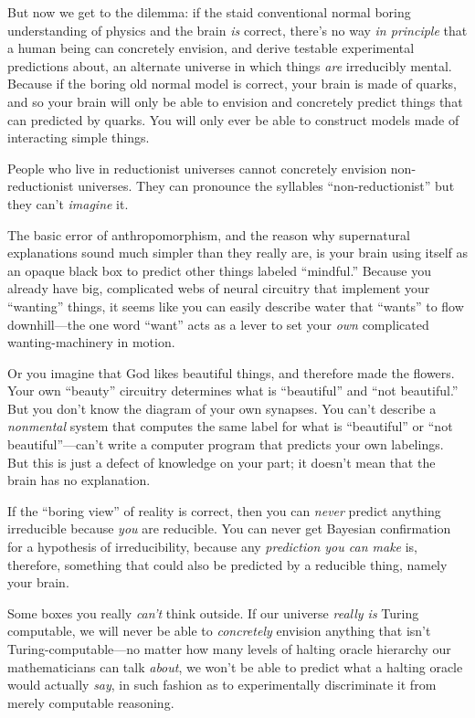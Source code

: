 {
 But now we get to the dilemma: if the staid conventional normal
boring understanding of physics and the brain \textit{is} correct,
there's no way \textit{in principle} that a human being
can concretely envision, and derive testable experimental predictions
about, an alternate universe in which things \textit{are} irreducibly
mental. Because if the boring old normal model is correct, your brain
is made of quarks, and so your brain will only be able to envision and
concretely predict things that can predicted by quarks. You will only
ever be able to construct models made of interacting simple things.}

{
 People who live in reductionist universes cannot concretely
envision non-reductionist universes. They can pronounce the syllables
``non-reductionist'' but they
can't \textit{imagine} it.}

{
 The basic error of anthropomorphism, and the reason why
supernatural explanations sound much simpler than they really are, is
your brain using itself as an opaque black box to predict other things
labeled ``mindful.'' Because you
already have big, complicated webs of neural circuitry that implement
your ``wanting'' things, it seems
like you can easily describe water that
``wants'' to flow downhill---the one
word ``want'' acts as a lever to set
your \textit{own} complicated wanting-machinery in motion.}

{
 Or you imagine that God likes beautiful things, and therefore made
the flowers. Your own ``beauty''
circuitry determines what is
``beautiful'' and
``not beautiful.'' But you
don't know the diagram of your own synapses. You
can't describe a \textit{nonmental} system that
computes the same label for what is
``beautiful'' or
``not
beautiful''---can't write a computer
program that predicts your own labelings. But this is just a defect of
knowledge on your part; it doesn't mean that the brain
has no explanation.}

{
 If the ``boring view'' of
reality is correct, then you can \textit{never} predict anything
irreducible because \textit{you} are reducible. You can never get
Bayesian confirmation for a hypothesis of irreducibility, because any
\textit{prediction you can make} is, therefore, something that could
also be predicted by a reducible thing, namely your brain.}

{
 Some boxes you really \textit{can't} think
outside. If our universe \textit{really is} Turing computable, we will
never be able to \textit{concretely} envision anything that
isn't Turing-computable---no matter how many levels of
halting oracle hierarchy our mathematicians can talk \textit{about}, we
won't be able to predict what a halting oracle would
actually \textit{say}, in such fashion as to experimentally
discriminate it from merely computable reasoning.}


